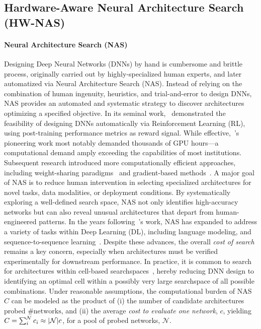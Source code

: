 \label{background}
\subsection{Hardware-Aware Neural Architecture Search (HW-NAS)}

\paragraph{Neural Architecture Search (NAS)}
Designing Deep Neural Networks (DNNs) by hand is cumbersome and brittle process, originally carried out by highly-specialized human experts, and later automatized via Neural Architecture Search (NAS).
Instead of relying on the combination of human ingenuity, heuristics, and trial-and-error to design DNNs, NAS provides an automated and systematic strategy to discover architectures optimizing a specified objective. 
In its seminal work,~\citet{zoph2016neural} demonstrated the feasibility of designing DNNs automatically via Reinforcement Learning (RL), using post-training performance metrics as reward signal.
While effective,~\citep{zoph2016neural}'s pioneering work most notably demanded thousands of GPU hours---a computational demand amply exceeding the capabilities of most institutions.
Subsequent research introduced more computationally efficient approaches, including weight-sharing paradigms~\citep{brock2017smash} and gradient-based methods~\citep{liu2018darts}.
A major goal of NAS is to reduce human intervention in selecting specialized architectures for novel tasks, data modalities, or deployment conditions. By systematically exploring a well-defined search space, NAS not only identifies high-accuracy networks but can also reveal unusual architectures that depart from human-engineered patterns. 
In the years following~\citet{zoph2016neural}'s work, NAS has expanded to address a variety of tasks within Deep Learning (DL), including language modeling, and sequence-to-sequence learning~\citep{elsken2019neural}. 
Despite these advances, the overall \emph{cost of search} remains a key concern, especially when architectures must be verified experimentally for downstream performance. In practice, it is common to search for architectures within cell-based searchspaces~\citep{zoph2018learning}, hereby reducing DNN design to identifying an optimal cell within a possibly very large searchspace of all possible combinations.
Under reasonable assumptions, the computational burden of NAS \(C \) can be modeled as the product of (i) the number of candidate architectures probed \( \#\text{networks}\), and (ii) the average \emph{cost to evaluate one network}, \( c \), yielding \( C = \sum_i^{\mathcal N} c_i \approx \vert \mathcal N \vert c \), for a pool of probed networks, \(\mathcal N \). 

